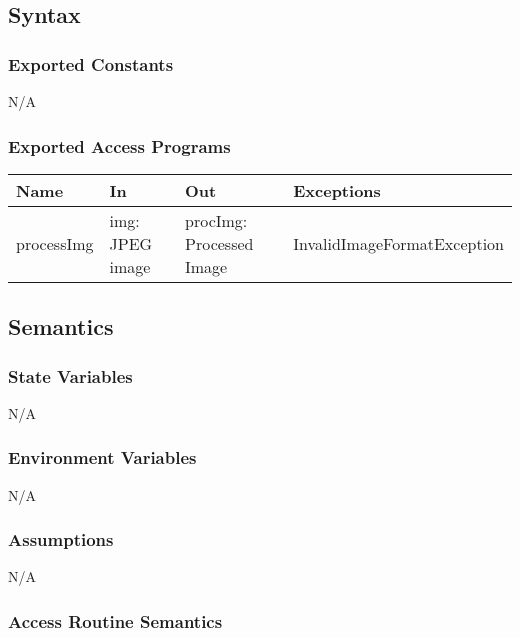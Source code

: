 \documentclass[12pt, titlepage]{article}
\begin{document}
\subsection{Syntax}

\subsubsection{Exported Constants}
N/A

\subsubsection{Exported Access Programs}

\begin{center}
  \begin{tabular}{p{3cm} p{4cm} p{4cm} p{3cm}}
    \hline
    \textbf{Name} & \textbf{In} & \textbf{Out} & \textbf{Exceptions} \\
    \hline
    processImg & img: JPEG image & procImg: Processed Image &
      InvalidImageFormatException \\
    \hline
  \end{tabular}
\end{center}

\subsection{Semantics}

\subsubsection{State Variables}
N/A

\subsubsection{Environment Variables}
N/A

\subsubsection{Assumptions}
N/A

\subsubsection{Access Routine Semantics}
\end{document}
